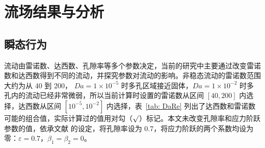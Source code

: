 \chapter{流场结果与分析}\label{chap: flow pattern}

\section{瞬态行为}\label{sec: transient}

流动由雷诺数、达西数、孔隙率等多个参数决定，当前的研究中主要通过改变雷诺数和达西数得到不同的流动，并探究参数对流动的影响。非稳态流动的雷诺数范围大约为从 40 到 200， $Da=1\times 10^{-5}$ 时多孔区域接近固体，$Da=1\times 10^{-2}$ 时多孔内的流动已经非常微弱，所以当前计算时设置的雷诺数从区间 $[40,200]$ 内选择，达西数从区间 $[10^{-5},10^{-2}]$ 内选择，表~\ref{tab: DaRe} 列出了达西数和雷诺数可能的组合值，实际计算过的值用对勾（$\surd$）标记。本文未改变孔隙率和应力阶跃参数的值，依承文献  的设定，将孔隙率设为 0.7，将应力阶跃的两个系数均设为零：$\varepsilon=0.7$，$\beta_1 = \beta_2=0$。


